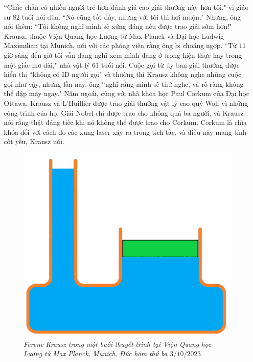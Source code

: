 \begin{multicols}{2}
	\vskip 0.1cm
	``Chắc chắn có nhiều người trẻ hơn đánh giá cao giải thưởng này hơn tôi," vị giáo sư $82$ tuổi nói đùa. ``Nó cũng tốt đấy, nhưng với tôi thì hơi muộn."
	\vskip 0.1cm
	Nhưng, ông nói thêm: ``Tôi không nghĩ mình sẽ xứng đáng nếu được trao giải sớm hơn!"
	\vskip 0.1cm
	Krausz, thuộc Viện Quang học Lượng tử Max Planck và Đại học Ludwig Maximilian tại Munich, nói với các phóng viên rằng ông bị choáng ngợp.
	\vskip 0.1cm
	``Từ $11$ giờ sáng đến giờ tôi vẫn đang nghĩ xem mình đang ở trong hiện thực hay trong một giấc mơ dài," nhà vật lý $61$ tuổi nói.
	\vskip 0.1cm
	Cuộc gọi từ ủy ban giải thưởng được hiển thị ``không có ID người gọi" và thường thì Krausz không nghe những cuộc gọi như vậy, nhưng lần này, ông ``nghĩ rằng mình sẽ thử nghe, và rõ ràng không thể dập máy ngay."
	\vskip 0.1cm
	Năm ngoái, cùng với nhà khoa học Paul Corkum của Đại học Ottawa, Krausz và L'Huillier được trao giải thưởng vật lý cao quý Wolf vì những công trình của họ. Giải Nobel chỉ được trao cho không quá ba người, và Krausz nói rằng thật đáng tiếc khi nó không thể được trao cho Corkum.
	\vskip 0.1cm
	Corkum là chìa khóa đối với cách đo các xung laser xảy ra trong tích tắc, và điều này mang tính cốt yếu, Krausz nói.
	\begin{figure}[H]
		\vspace*{-5pt}
		\centering
		\captionsetup{labelformat= empty, justification=centering}
		\includegraphics[width= 1\linewidth]{5}
		\caption{\small\textit{\color{timhieukhoahoc}Ferenc Krausz trong một buổi thuyết trình tại Viện Quang học Lượng tử Max Planck, Munich, Đức hôm thứ ba $3/10/2023$.}}

\end{figure}
\end{multicols}
